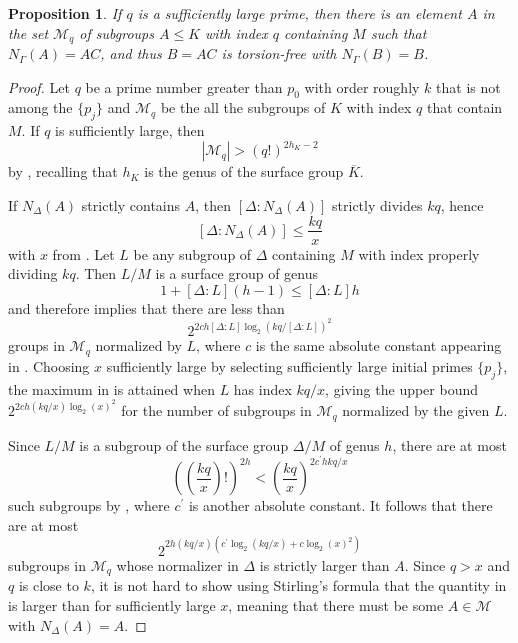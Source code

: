 \documentclass[11pt]{article}
\theoremstyle{plain}
\newtheorem{prop}[thm]{Proposition}
\theoremstyle{definition}
\theoremstyle{remark}
\newcommand{\calM}{\mathcal{M}}
\newcommand{\Gam}{\Gamma}
\newcommand{\Del}{\Delta}
\newcommand{\conj}{\overline}
\newenvironment{pf}{\begin{proof}}{\end{proof}}
\begin{document}
\begin{prop}\label{prop:TrivialCase}
If $q$ is a sufficiently large prime, then there is an element $A$ in the set $\calM_q$ of subgroups $A \le K$ with index $q$ containing $M$ such that $N_\Gam(A) = AC$, and thus $B = AC$ is torsion-free with $N_\Gam(B) = B$.
\end{prop}
\begin{pf}
Let $q$ be a prime number greater than $p_0$ with order roughly $k$ that is not among the $\{p_j\}$ and $\calM_q$ be the all the subgroups of $K$ with index $q$ that contain $M$. If $q$ is sufficiently large, then
\begin{equation}\label{eq:SubgroupLowerBound}
|\calM_q| > (q!)^{2 h_K - 2}
\end{equation}
by \cite[Thm.\ 14.4.5]{LubotzkySegal}, recalling that $h_K$ is the genus of the surface group $\conj{K}$.

If $N_\Del(A)$ strictly contains $A$, then $[\Del : N_\Del(A)]$ strictly divides $k q$, hence
\begin{equation}\label{eq:TrivialBound1}
[\Del : N_\Del(A)] \le \frac{k q}{x}
\end{equation}
with $x$ from . Let $L$ be any subgroup of $\Del$ containing $M$ with index properly dividing $k q$. Then $L / M$ is a surface group of genus
\begin{equation}\label{eq:Trivialhbound}
1 + [\Del : L](h - 1) \le [\Del : L] h
\end{equation}
and therefore \cite[Thm.\ 2.7]{LubotzkySegal} implies that there are less than
\begin{equation}\label{eq:TrivialBound2}
2^{2 c h [\Del : L] \log_2(k q / [\Del : L])^2}
\end{equation}
groups in $\calM_q$ normalized by $L$, where $c$ is the same absolute constant appearing in . Choosing $x$ sufficiently large by selecting sufficiently large initial primes $\{p_j\}$, the maximum in  is attained when $L$ has index $k q / x$, giving the upper bound $2^{2 c h (kq / x) \log_2(x)^2}$ for the number of subgroups in $\calM_q$ normalized by the given $L$.

Since $L / M$ is a subgroup of the surface group $\Del / M$ of genus $h$, there are at most
\begin{equation}\label{eq:TrivialBound3}
\left(\left(\frac{k q}{x}\right)!\right)^{2 h} < \left(\frac{k q}{x}\right)^{2 c^\prime h k q / x}
\end{equation}
such subgroups by \cite[Cor.\ 1.1.2]{LubotzkySegal}, where $c^\prime$ is another absolute constant. It follows that there are at most
\begin{equation}\label{eq:TrivialBound4}
2^{2 h (k q /x)(c^\prime \log_2(k q / x) + c \log_2(x)^2)}
\end{equation}
subgroups in $\calM_q$ whose normalizer in $\Del$ is strictly larger than $A$. Since $q > x$ and $q$ is close to $k$, it is not hard to show using Stirling's formula that the quantity in  is larger than  for sufficiently large $x$, meaning that there must be some $A \in \calM$ with $N_\Del(A) = A$.


\end{pf}
\end{document}

